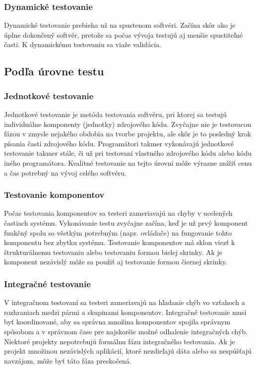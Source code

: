 \documentclass[11pt,twoside,slovak,a4paper]{article}
\begin{document}
		\subsubsection{Dynamické testovanie}
			Dynamické testovanie prebieha už na spustenom softvéri. Začína skôr ako je úplne dokončený softvér, pretože sa počas vývoja testujú aj menšie spustiteľné časti. K dynamickému testovaniu sa viaže validácia.
	
	\subsection{Podľa úrovne testu}
		\subsubsection{Jednotkové testovanie} 
			Jednotkové testovanie je metóda testovania softvéru, pri ktorej sa testujú individuálne komponenty (jednotky) zdrojového kódu. Zvyčajne nie je testovacou fázou v zmysle nejakého obdobia na tvorbe projektu, ale skôr je to posledný krok písania časti zdrojového kódu\cite{Alba2008}. Programátori takmer vykonávajú jednotkové testovanie takmer stále, či už pri testovaní vlastného zdrojového kódu alebo kódu iného programátora\cite{Alba2008}. Kvalitné testovanie na tejto úrovni môže výrazne znížiť cenu a čas potrebný na vývoj celého softvéru\cite{EST2002}.
		\subsubsection{Testovanie komponentov} 
			Počas testovania komponentov sa testeri zameriavajú na chyby v ucelených častiach systému. Vykonávanie testu zvyčajne začína, keď je už prvý komponent funkčný spolu so všetkým potrebným (napr. ovládače) na fungovanie tohto komponentu bez zbytku systému\cite{Alba2008}.\newline
			Testovanie komponentov má sklon viezť k štrukturálnemu testovaniu alebo testovaniu formou bielej skrinky. Ak je komponent nezávislý môže sa použiť aj testovanie formou čiernej skrinky\cite{Alba2008}.
		\subsubsection{Integračné testovanie} 
			V integračnom testovaní sa testeri zameriavajú na hľadanie chýb vo vzťahoch a rozhraniach medzi pármi a skupinami komponentov. Integračné testovanie musí byť koordinované, aby sa správna množina komponentov spojila správnym spôsobom a v správnom čase	pre najskoršie možné odhalenie integračných chýb\cite{Alba2008}.
			Niektoré projekty nepotrebujú formálnu fázu integračného testovania. Ak je projekt množinou nezávislých aplikácií, ktoré nezdieľajú dáta alebo sa nespúšťajú navzájom, môže byť táto fáza preskočená\cite{Alba2008}.
\end{document}
